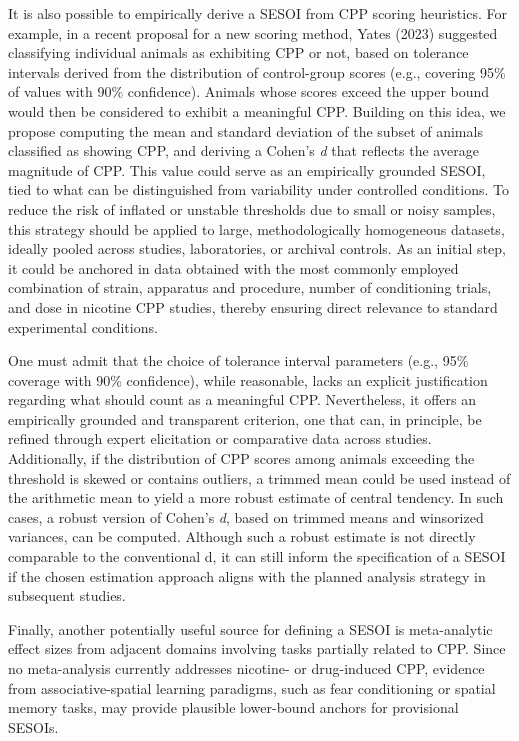 \documentclass[authordate, meta]{jote-new-article}
\begin{document}
	It is also possible to empirically derive a SESOI from CPP scoring heuristics. For example, in a recent proposal for a new scoring method, Yates (2023) suggested classifying individual animals as exhibiting CPP or not, based on tolerance intervals derived from the distribution of control-group scores (e.g., covering 95\% of values with 90\% confidence). Animals whose scores exceed the upper bound would then be considered to exhibit a meaningful CPP. Building on this idea, we propose computing the mean and standard deviation of the subset of animals classified as showing CPP, and deriving a Cohen's \emph{d} that reflects the average magnitude of CPP. This value could serve as an empirically grounded SESOI, tied to what can be distinguished from variability under controlled conditions. To reduce the risk of inflated or unstable thresholds due to small or noisy samples, this strategy should be applied to large, methodologically homogeneous datasets, ideally pooled across studies, laboratories, or archival controls. As an initial step, it could be anchored in data obtained with the most commonly employed combination of strain, apparatus and procedure, number of conditioning trials, and dose in nicotine CPP studies, thereby ensuring direct relevance to standard experimental conditions.



	One must admit that the choice of tolerance interval parameters (e.g., 95\% coverage with 90\% confidence), while reasonable, lacks an explicit justification regarding what should count as a meaningful CPP. Nevertheless, it offers an empirically grounded and transparent criterion, one that can, in principle, be refined through expert elicitation or comparative data across studies. Additionally, if the distribution of CPP scores among animals exceeding the threshold is skewed or contains outliers, a trimmed mean could be used instead of the arithmetic mean to yield a more robust estimate of central tendency. In such cases, a robust version of Cohen's \emph{d}, based on trimmed means and winsorized variances, can be computed. Although such a robust estimate is not directly comparable to the conventional d, it can still inform the specification of a SESOI if the chosen estimation approach aligns with the planned analysis strategy in subsequent studies.



	Finally, another potentially useful source for defining a SESOI is meta-analytic effect sizes from adjacent domains involving tasks partially related to CPP. Since no meta-analysis currently addresses nicotine- or drug-induced CPP, evidence from associative-spatial learning paradigms, such as fear conditioning or spatial memory tasks, may provide plausible lower-bound anchors for provisional SESOIs.
\end{document}
